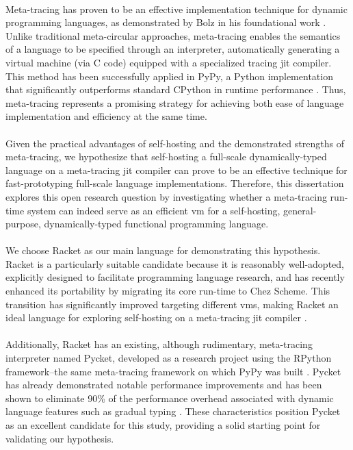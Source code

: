         \paragraph{}%
            Meta-tracing has proven to be an effective implementation technique for dynamic programming languages, as demonstrated by Bolz in his foundational work \cite{bolzPhDThesis}. Unlike traditional meta-circular approaches, meta-tracing enables the semantics of a language to be specified through an interpreter, automatically generating a virtual machine (via C code) equipped with a specialized tracing \gls{jit} compiler. This method has been successfully applied in PyPy, a Python implementation that significantly outperforms standard CPython in runtime performance \cite{pypy-main}. Thus, meta-tracing represents a promising strategy for achieving both ease of language implementation and efficiency at the same time.

        \paragraph{}%
            Given the practical advantages of self-hosting and the demonstrated strengths of meta-tracing, we hypothesize that self-hosting a full-scale dynamically-typed language on a meta-tracing \gls{jit} compiler can prove to be an effective technique for fast-prototyping full-scale language implementations. Therefore, this dissertation explores this open research question by investigating whether a meta-tracing run-time system can indeed serve as an efficient \gls{vm} for a self-hosting, general-purpose, dynamically-typed functional programming language.

        \paragraph{}%
            We choose Racket as our main language for demonstrating this hypothesis. Racket is a particularly suitable candidate because it is reasonably well-adopted, explicitly designed to facilitate programming language research, and has recently enhanced its portability by migrating its core run-time to Chez Scheme. This transition has significantly improved targeting different \glspl{vm}, making Racket an ideal language for exploring self-hosting on a meta-tracing \gls{jit} compiler \cite{icfp2019}.

        \paragraph{}%
            Additionally, Racket has an existing, although rudimentary, meta-tracing interpreter named Pycket, developed as a research project using the RPython framework--the same meta-tracing framework on which PyPy was built \cite{bolzPhDThesis,bolzMetatracingMakesFast2014}. Pycket has already demonstrated notable performance improvements and has been shown to eliminate 90\% of the performance overhead associated with dynamic language features such as gradual typing \cite{pycketmain,pycketmain2}. These characteristics position Pycket as an excellent candidate for this study, providing a solid starting point for validating our hypothesis.

